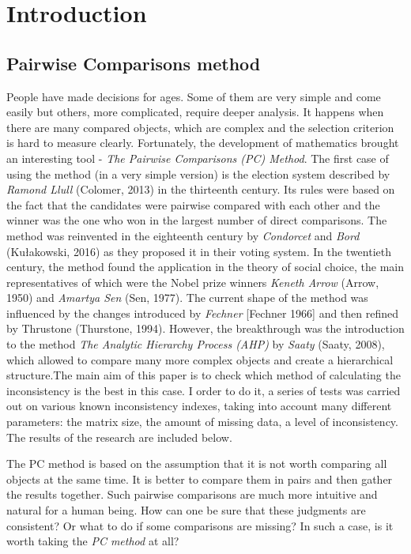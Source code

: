 \chapter{Introduction}
\label{cha:wprowadzenie}

\section{Pairwise Comparisons method}
\label{sec:metodaPorowan}
People have made decisions for ages. Some of them are very simple and come easily but others, more complicated, require deeper analysis. It happens when there are many compared objects, which are complex and the selection criterion is hard to measure clearly. Fortunately, the development of mathematics brought an interesting tool - \textit{The Pairwise Comparisons (PC) Method}. The first case of using the method (in a very simple version) is the election system described by \textit{Ramond Llull} (Colomer, 2013) in the thirteenth century. Its rules were based on the fact that the candidates were pairwise compared with each other and the winner was the one who won in the largest number of direct comparisons. The method was reinvented in the eighteenth century by \textit{Condorcet} and \textit{Bord} (Kułakowski, 2016) as they proposed it in their voting system. In the twentieth century, the method found the application in the theory of social choice, the main representatives of which were the Nobel prize winners \textit{Keneth Arrow} (Arrow, 1950) and \textit{Amartya Sen} (Sen, 1977). The current shape of the method was influenced by the changes introduced by \textit{Fechner} [Fechner 1966] and then refined by {Thrustone} (Thurstone, 1994). However, the breakthrough was the introduction to the method \textit\textit{The Analytic Hierarchy Process (AHP)} by \textit{Saaty} (Saaty, 2008), which allowed to compare many more complex objects and create a hierarchical structure.The main aim of this paper is to check which method of calculating the inconsistency is the best in this case. I order to do it, a series of tests was carried out on various known inconsistency indexes, taking into account many different parameters: the matrix size, the amount of missing data, a level of inconsistency. The results of the research are included below.

The PC method is based on the assumption that it is not worth comparing all objects at the same time. It is better to compare them in pairs and then gather the results together. Such pairwise comparisons are much more intuitive and natural for a human being. How can one be sure that these judgments are consistent? Or what to do if some comparisons are missing? In such a case, is it worth taking the \textit{PC method} at all?

